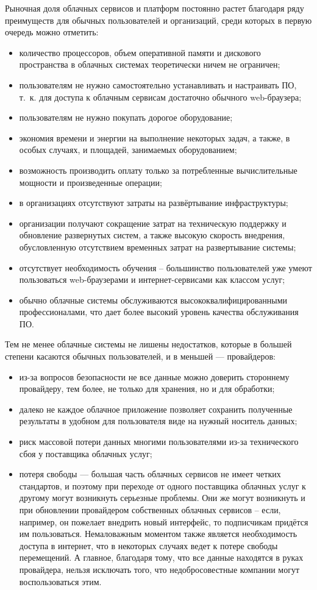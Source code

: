 \documentclass[a5paper,10pt]{article}
\begin{document}
Рыночная доля облачных сервисов и платформ постоянно растет благодаря ряду преимуществ для обычных пользователей и организаций, среди которых в первую очередь можно отметить:
\begin{itemize}
\item	количество процессоров, объем оперативной памяти и дискового пространства в облачных системах теоретически ничем не ограничен;
\item	пользователям не нужно самостоятельно устанавливать и настраивать ПО, т.~к. для доступа к облачным сервисам достаточно обычного web-браузера; 
\item	пользователям не нужно покупать дорогое оборудование; 
\item	экономия времени и энергии на выполнение некоторых задач, а также, в особых случаях, и площадей, занимаемых оборудованием;
\item	возможность производить оплату только за потребленные вычислительные мощности и произведенные операции;
\item	в организациях отсутствуют затраты на развёртывание инфраструктуры;
\item	организации получают сокращение затрат на техническую поддержку и обновление развернутых систем, а также высокую скорость внедрения, обусловленную отсутствием временных затрат на развертывание системы;
\item	отсутствует необходимость обучения -- большинство пользователей уже умеют пользоваться web-браузерами и интернет-сервисами как классом услуг;
\item	обычно облачные системы обслуживаются высококвалифицированными профессионалами, что дает более высокий уровень качества обслуживания ПО.
\end{itemize}

Тем не менее облачные системы не лишены недостатков, которые в большей степени касаются обычных пользователей, и в меньшей --- провайдеров:
\begin{itemize}
\item из-за вопросов безопасности не все данные можно доверить стороннему провайдеру, тем более, не только для хранения, но и для обработки;
\item далеко не каждое облачное приложение позволяет сохранить полученные результаты в удобном для пользователя виде на нужный носитель данных;
\item риск массовой потери данных многими пользователями из-за технического сбоя у поставщика облачных услуг;
\item потеря свободы --- большая часть облачных сервисов не имеет четких стандартов, и поэтому при переходе от одного поставщика облачных услуг к другому могут возникнуть серьезные проблемы. Они же могут возникнуть и при обновлении провайдером собственных облачных сервисов -- если, например, он пожелает внедрить новый интерфейс, то подписчикам придётся им пользоваться.  Немаловажным моментом также является необходимость доступа в интернет, что в некоторых случаях ведет к потере свободы перемещений. А главное, благодаря тому, что все данные находятся в руках провайдера, нельзя исключать того, что недобросовестные компании могут воспользоваться этим.
\end{itemize}
\end{document}
